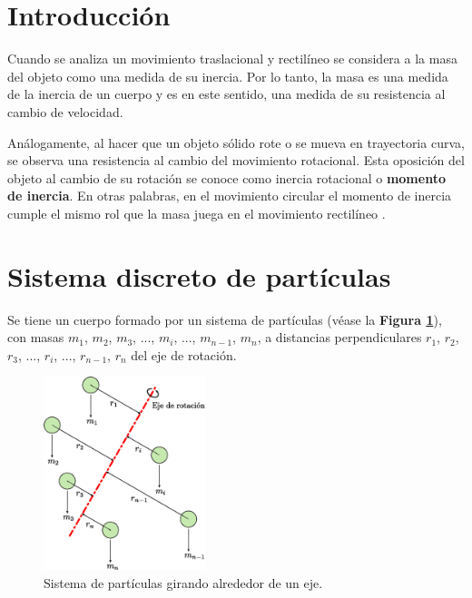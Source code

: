 \documentclass[letter,oneside,11pt]{article}
\begin{document}
\clearpage
\setcounter{page}{1}

\tableofcontents
\newpage

\section{Introducción}
Cuando se analiza un movimiento traslacional y rectilíneo se considera a la masa
del objeto como una medida de su inercia. Por lo tanto, la masa es una medida de
la inercia de un cuerpo y es en este sentido, una medida de su resistencia al
cambio de velocidad.

Análogamente, al hacer que un objeto sólido rote o se mueva en trayectoria
curva, se observa una resistencia al cambio del movimiento rotacional. Esta
oposición del objeto al cambio de su rotación se conoce como inercia rotacional
o \textbf{momento de inercia}. En otras palabras, en el movimiento circular el
momento de inercia cumple el mismo rol que la masa juega en el movimiento
rectilíneo \cite{FISIC.CH}.

\section{Sistema discreto de partículas \cite{Sears}}
Se tiene un cuerpo formado por un sistema de partículas (véase la \textbf{Figura
\ref{figura1}}), con masas $m_1$, $m_2$, $m_3$, ..., $m_i$, ..., $m_{n-1}$,
$m_n$, a distancias perpendiculares $r_1$, $r_2$, $r_3$, ..., $r_i$, ...,
$r_{n-1}$, $r_n$ del eje de rotación.

\begin{figure}
\centering
\includegraphics[width=0.42\textwidth]{resources/f1.eps}
\caption{Sistema de partículas girando alrededor de un eje.}
\label{figura1}
\end{figure}
\end{document}
